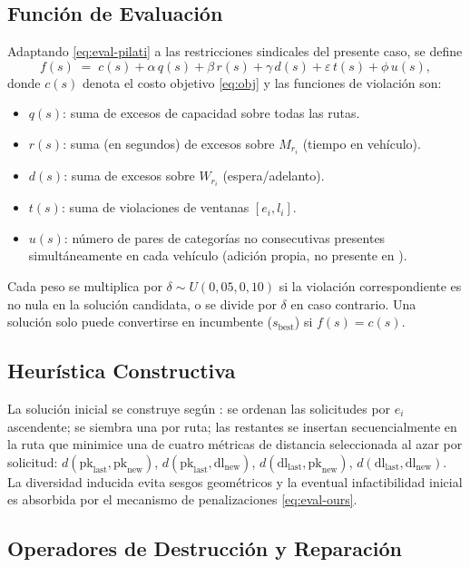 \subsection{Función de Evaluación}
Adaptando \eqref{eq:eval-pilati} a las restricciones sindicales del presente caso, se define
\begin{equation}
\label{eq:eval-ours}
f(s) \;=\; c(s) + \alpha\,q(s) + \beta\,r(s) + \gamma\,d(s) + \varepsilon\,t(s) + \phi\,u(s),
\end{equation}
donde $c(s)$ denota el costo objetivo \eqref{eq:obj} y las funciones de violación son:
\begin{itemize}
    \item $q(s)$: suma de excesos de capacidad sobre todas las rutas.
    \item $r(s)$: suma (en segundos) de excesos sobre $M_{r_i}$ (tiempo en vehículo).
    \item $d(s)$: suma de excesos sobre $W_{r_i}$ (espera/adelanto).
    \item $t(s)$: suma de violaciones de ventanas $[e_i,l_i]$.
    \item $u(s)$: número de pares de categorías no consecutivas presentes simultáneamente en cada vehículo (adición propia, no presente en \cite{Pilati2025}).
\end{itemize}
Cada peso se multiplica por $\delta\sim U(0{,}05,0{,}10)$ si la violación correspondiente es no nula en la solución candidata, o se divide por $\delta$ en caso contrario. Una solución solo puede convertirse en incumbente ($s_{\text{best}}$) si $f(s)=c(s)$.

\subsection{Heurística Constructiva}
La solución inicial se construye según \cite{Pilati2025}: se ordenan las solicitudes por $e_i$ ascendente; se siembra una por ruta; las restantes se insertan secuencialmente en la ruta que minimice una de cuatro métricas de distancia seleccionada al azar por solicitud: $d(\mathrm{pk}_{\mathrm{last}},\mathrm{pk}_{\mathrm{new}})$, $d(\mathrm{pk}_{\mathrm{last}},\mathrm{dl}_{\mathrm{new}})$, $d(\mathrm{dl}_{\mathrm{last}},\mathrm{pk}_{\mathrm{new}})$, $d(\mathrm{dl}_{\mathrm{last}},\mathrm{dl}_{\mathrm{new}})$. La diversidad inducida evita sesgos geométricos y la eventual infactibilidad inicial es absorbida por el mecanismo de penalizaciones \eqref{eq:eval-ours}.

\subsection{Operadores de Destrucción y Reparación}

